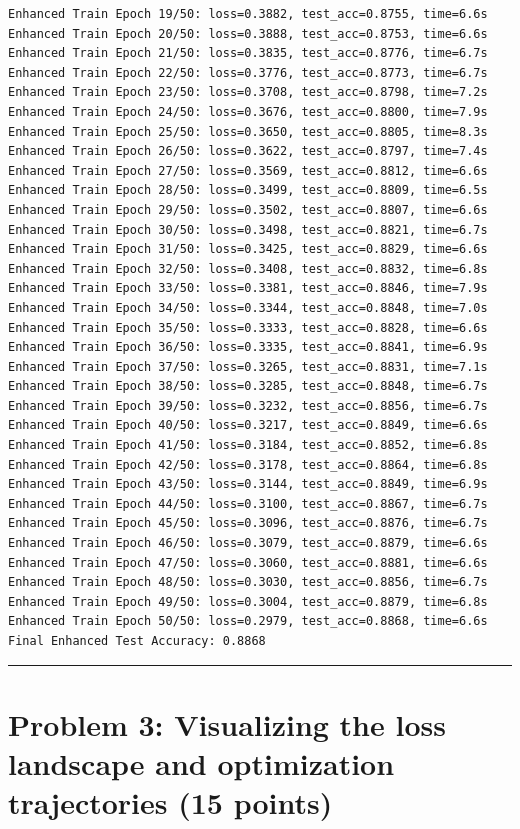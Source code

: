 \documentclass[
  letterpaper,
  DIV=11,
  numbers=noendperiod]{scrartcl}
\begin{document}
\begin{verbatim}
Enhanced Train Epoch 19/50: loss=0.3882, test_acc=0.8755, time=6.6s
Enhanced Train Epoch 20/50: loss=0.3888, test_acc=0.8753, time=6.6s
Enhanced Train Epoch 21/50: loss=0.3835, test_acc=0.8776, time=6.7s
Enhanced Train Epoch 22/50: loss=0.3776, test_acc=0.8773, time=6.7s
Enhanced Train Epoch 23/50: loss=0.3708, test_acc=0.8798, time=7.2s
Enhanced Train Epoch 24/50: loss=0.3676, test_acc=0.8800, time=7.9s
Enhanced Train Epoch 25/50: loss=0.3650, test_acc=0.8805, time=8.3s
Enhanced Train Epoch 26/50: loss=0.3622, test_acc=0.8797, time=7.4s
Enhanced Train Epoch 27/50: loss=0.3569, test_acc=0.8812, time=6.6s
Enhanced Train Epoch 28/50: loss=0.3499, test_acc=0.8809, time=6.5s
Enhanced Train Epoch 29/50: loss=0.3502, test_acc=0.8807, time=6.6s
Enhanced Train Epoch 30/50: loss=0.3498, test_acc=0.8821, time=6.7s
Enhanced Train Epoch 31/50: loss=0.3425, test_acc=0.8829, time=6.6s
Enhanced Train Epoch 32/50: loss=0.3408, test_acc=0.8832, time=6.8s
Enhanced Train Epoch 33/50: loss=0.3381, test_acc=0.8846, time=7.9s
Enhanced Train Epoch 34/50: loss=0.3344, test_acc=0.8848, time=7.0s
Enhanced Train Epoch 35/50: loss=0.3333, test_acc=0.8828, time=6.6s
Enhanced Train Epoch 36/50: loss=0.3335, test_acc=0.8841, time=6.9s
Enhanced Train Epoch 37/50: loss=0.3265, test_acc=0.8831, time=7.1s
Enhanced Train Epoch 38/50: loss=0.3285, test_acc=0.8848, time=6.7s
Enhanced Train Epoch 39/50: loss=0.3232, test_acc=0.8856, time=6.7s
Enhanced Train Epoch 40/50: loss=0.3217, test_acc=0.8849, time=6.6s
Enhanced Train Epoch 41/50: loss=0.3184, test_acc=0.8852, time=6.8s
Enhanced Train Epoch 42/50: loss=0.3178, test_acc=0.8864, time=6.8s
Enhanced Train Epoch 43/50: loss=0.3144, test_acc=0.8849, time=6.9s
Enhanced Train Epoch 44/50: loss=0.3100, test_acc=0.8867, time=6.7s
Enhanced Train Epoch 45/50: loss=0.3096, test_acc=0.8876, time=6.7s
Enhanced Train Epoch 46/50: loss=0.3079, test_acc=0.8879, time=6.6s
Enhanced Train Epoch 47/50: loss=0.3060, test_acc=0.8881, time=6.6s
Enhanced Train Epoch 48/50: loss=0.3030, test_acc=0.8856, time=6.7s
Enhanced Train Epoch 49/50: loss=0.3004, test_acc=0.8879, time=6.8s
Enhanced Train Epoch 50/50: loss=0.2979, test_acc=0.8868, time=6.6s
Final Enhanced Test Accuracy: 0.8868
\end{verbatim}

\begin{center}\rule{0.5\linewidth}{0.5pt}\end{center}

\section{Problem 3: Visualizing the loss landscape and optimization
trajectories (15
points)}\label{problem-3-visualizing-the-loss-landscape-and-optimization-trajectories-15-points}
\end{document}
